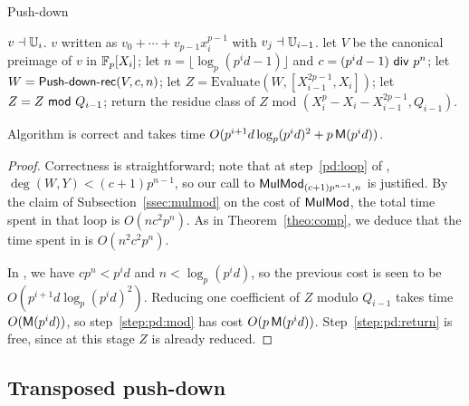 \begin{algorithm}
  \caption{Push-down}
  \begin{algorithmic}[1]
    \REQUIRE $v\dashv \mathbb{U}_i$.
    \ENSURE $v$ written as $v_0+\cdots+v_{p-1}x_i^{p-1}$ with $v_j \dashv \mathbb{U}_{i-1}$.
    \STATE let $V$ be the canonical preimage of $v$ in $\mathbb{F}_p[X_i]$;
    \STATE let $n=\lfloor \log_p(p^id-1) \rfloor$ and $c=(p^id-1){\sf~div~} p^n$;
    \STATE let $W = \text{{\sf Push-down-rec}}(V,c,n)$;
    \STATE let $Z = \text{Evaluate}(W,[X_{i-1}^{2p-1},X_i])$;
    \STATE \label{step:pd:mod} let $Z = Z {\sf~mod~} Q_{i-1}$;
    \STATE \label{step:pd:return} return the residue class of $Z$ mod $(X_i^p - X_i - X_{i-1}^{2p-1},Q_{i-1})$.
  \end{algorithmic}
\end{algorithm}

\begin{proposition}\label{prop:pd}
  Algorithm  is correct and takes time $O(p^{i+1}d
  \log_p(p^id)^2 + p\,\mathsf{M}(p^id))$.
\end{proposition}
\begin{proof}
  Correctness is straightforward; note that at step~\ref{pd:loop} of
  , $\deg(W,Y) < (c+1)p^{n-1}$, so our call to
  ${\sf MulMod}_{(c+1)p^{n-1},n}$ is justified. By the claim of
  Subsection~\ref{ssec:mulmod} on the cost of ${\sf MulMod}$, the
  total time spent in that loop is $O(nc^2p^n)$. As in
  Theorem~\ref{theo:comp}, we deduce that the time spent in
   is $O(n^2c^2p^n)$.

  In , we have $cp^n< p^id$ and $n<\log_p (p^id)$, so
  the previous cost is seen to be $O(p^{i+1}d
  \log_p(p^id)^2)$. Reducing one coefficient of $Z$ modulo $Q_{i-1}$
  takes time $O(\mathsf{M}(p^id))$, so step~\ref{step:pd:mod} has cost
  $O(p\,\mathsf{M}(p^id))$. Step~\ref{step:pd:return} is free, since at
  this stage $Z$ is already reduced. 
\end{proof}


\subsection{Transposed push-down}


